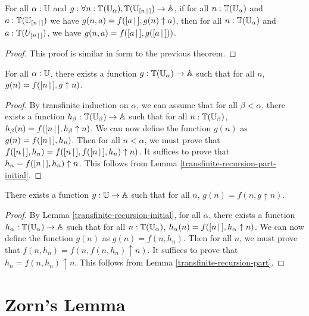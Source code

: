 \documentclass[../math.tex]{subfiles}
\begin{document}
\begin{lemma} \label{transfinite-recursion-part-initial}
    For all $\alpha : \mathbb{U}$ and $g : \forall n : \mathbb{T}(\mathbb{U}_\alpha), \mathbb{T}(\mathbb{U}_{[ n\, |\,]})
    \to \mathbb{A}$, if for all $n : \mathbb{T}(\mathbb{U}_\alpha)$ and $a : \mathbb{T}(\mathbb{U}_{[ n\, |\,]})$ we have
    $g(n, a) = f([ a\, |\,], g(n) \uparrow a)$, then for all $n : \mathbb{T}(\mathbb{U}_\alpha)$ and
    $a : \mathbb{T}(U_{[ n\, |\,]})$, we have $g(n, a) = f([ a\, |\,], g([ a\, |\,]))$.
\end{lemma}
\begin{proof}
    This proof is similar in form to the previous theorem.
\end{proof}

\begin{lemma} \label{transfinite-recursion-initial}
    For all $\alpha : \mathbb{U}$, there exists a function $g : \mathbb{T}(\mathbb{U}_\alpha) \to \mathbb{A}$
    such that for all $n$, $g(n) = f([ n\, |\,], g \uparrow n)$.
\end{lemma}
\begin{proof}
    By transfinite induction on $\alpha$, we can assume that for all $\beta <
    \alpha$, there exists a function $h_\beta : \mathbb{T}(\mathbb{U}_\beta) \to \mathbb{A}$ such that
    for all $n : \mathbb{T}(\mathbb{U}_\beta)$, $h_\beta(n) = f([ n\, |\,], h_\beta \uparrow n)$.
    We can now define the function $g(n)$ as $g(n) = f([ n\, |\,], h_n)$.  Then for
    all $n < \alpha$, we must prove that $f([ n\, |\,], h_n) = f([ n\, |\,], f([ n\, |\,],
    h_n) \uparrow n)$.  It suffices to prove that $h_n = f([ n\, |\,], h_n) \uparrow
    n$.  This follows from Lemma \ref{transfinite-recursion-part-initial}.
\end{proof}

\begin{theorem}
    There exists a function $g : \mathbb{U} \to \mathbb{A}$ such that for all $n$, $g(n) = f(n,
    g \uparrow n)$.
\end{theorem}
\begin{proof}
    By Lemma \ref{transfinite-recursion-initial}, for all $\alpha$, there exists
    a function $h_\alpha : \mathbb{T}(\mathbb{U}_\alpha) \to \mathbb{A}$ such that for all $n :
    \mathbb{T}(\mathbb{U}_\alpha)$, $h_\alpha(n) = f([ n\, |\,], h_\alpha \uparrow n)$.  We can now
    define the function $g(n)$ as $g(n) = f(n, h_n)$.  Then for all $n$, we must
    prove that $f(n, h_n) = f(n, f(n, h_n) \uparrow n)$.  It suffices to prove
    that $h_n = f(n, h_n) \uparrow n$.  This follows from Lemma
    \ref{transfinite-recursion-part}.
\end{proof}

\section{Zorn's Lemma}
\end{document}
